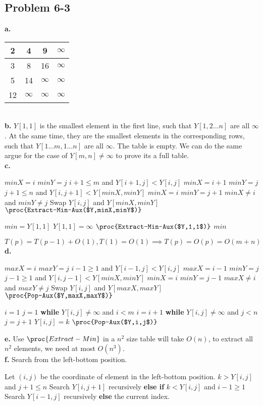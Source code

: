 \documentclass[12pt]{article}
\theoremstyle{definition}
\theoremstyle{remark}
\begin{document}
\subsection*{Problem 6-3}
\textbf{a.}\\
\begin{tabular}{|c|c|c|c|}\hline
2 & 4 & 9 & $\infty$\\ \hline
3 & 8 & 16 & $\infty$\\ \hline
5 & 14 & $\infty$ & $\infty$\\ \hline
12 & $\infty$ & $\infty$ & $\infty$\\ \hline
\end{tabular}\\
\textbf{b.} $Y[1,1]$ is the smallest element in the first line, such that $Y[1,2...n]$ are all $\infty$. At the same time, they are the smallest elements in the corresponding rows, such that $Y[1...m,1...n]$ are all $\infty$. The table is empty. We can do the same argue for the case of $Y[m,n]\ne\infty$ to prove its a full table.\\
\textbf{c.}
\begin{codebox}
\li $minX=i$
\li $minY=j$
\li \If $i+1\le m$ and $Y[i+1,j]<Y[i,j]$
\li \quad $minX=i+1$
\li \quad $minY=j$
\li \If $j+1\le n$ and $Y[i,j+1]<Y[minX,minY]$
\li \quad $minX=i$
\li \quad $minY=j+1$
\li \If $minX\ne i$ and $minY\ne j$
\li \quad Swap $Y[i,j]$ and $Y[minX,minY]$
\li \quad $\proc{Extract-Min-Aux($Y,minX,minY$)}$
\end{codebox}
\begin{codebox}
\li $min=Y[1,1]$
\li $Y[1,1]=\infty$
\li $\proc{Extract-Min-Aux($Y,1,1$)}$
\li \Return $min$
\end{codebox}
$T(p)=T(p-1)+O(1),T(1)=O(1)\implies T(p)=O(p)=O(m+n)$\\
\textbf{d.}
\begin{codebox}
\li $maxX=i$
\li $maxY=j$
\li \If $i-1\ge 1$ and $Y[i-1,j]<Y[i,j]$
\li \quad $maxX=i-1$
\li \quad $minY=j$
\li \If $j-1\ge 1$ and $Y[i,j-1]<Y[minX,minY]$
\li \quad $minX=i$
\li \quad $minY=j-1$
\li \If $maxX\ne i$ and $maxY\ne j$
\li \quad Swap $Y[i,j]$ and $Y[maxX,maxY]$
\li \quad $\proc{Pop-Aux($Y,maxX,maxY$)}$
\end{codebox}
\begin{codebox}
\li $i=1$
\li $j=1$
\li \textbf{while} $Y[i,j]\ne \infty$ and $i<m$
\li \quad $i=i+1$
\li \textbf{while} $Y[i,j]\ne \infty$ and $j<n$
\li \quad $j=j+1$
\li $Y[i,j]=k$
\li $\proc{Pop-Aux($Y,i,j$)}$
\end{codebox}
\textbf{e.}
Use $\proc{Extract-Min}$ in a $n^2$ size table will take $O(n)$, to extract all $n^2$ elements, we need at most $O(n^3)$.\\
\textbf{f.}
Search from the left-bottom position.
\begin{codebox}
\li Let $(i,j)$ be the coordinate of element in the left-bottom position.
\li \If $k>Y[i,j]$ and $j+1\le n$ Search $Y[i,j+1]$ recursively
\li \textbf{else if} $k<Y[i,j]$ and $i-1\ge 1$ Search $Y[i-1,j]$ recursively
\li \textbf{else} \Return the current index.
\end{codebox}
\end{document}
